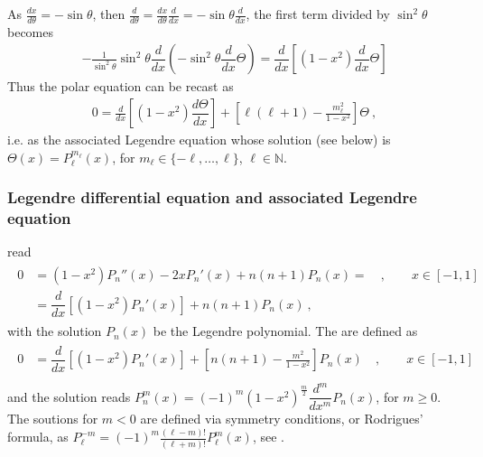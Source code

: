 \documentclass[letterpaper,10pt,english]{jupyterBook}
\begin{document}
\sphinxAtStartPar
As \(\frac{d x}{d \theta} = - \sin \theta\), then \(\frac{d}{d\theta} = \frac{d x}{d \theta} \frac{d}{d x} = - \sin \theta \frac{d}{d x}\), the first term \sphinxhyphen{} divided by \(\sin^2 \theta\) \sphinxhyphen{} becomes
\begin{equation*}
\begin{split}-\frac{1}{\sin^2 \theta} \sin^2 \theta \dfrac{d}{dx} \left( - \sin^2 \theta \dfrac{d}{dx} \Theta \right) = \dfrac{d}{dx}\left[ ( 1 - x^2) \dfrac{d}{dx} \Theta \right]\end{split}
\end{equation*}
\sphinxAtStartPar
Thus the polar equation can be recast as
\begin{equation*}
\begin{split}0 = \frac{d}{dx} \left[ ( 1 - x^2 ) \dfrac{d \Theta}{dx} \right] + \left[ \ell(\ell+1) - \frac{m_\ell^2}{1 - x^2} \right] \Theta  \ ,\end{split}
\end{equation*}
\sphinxAtStartPar
i.e. as the associated Legendre equation whose solution (see below) is \(\Theta(x) = P_\ell^{m_{\ell}}(x)\), for \(m_{\ell} \in \{ - \ell, \dots, \ell\}\), \(\ell \in \mathbb{N}\).
\subsubsection*{Legendre differential equation and associated Legendre equation}

\sphinxAtStartPar
{} read
\begin{equation*}
\begin{split}\begin{aligned}
  0
  & = (1- x^2) P_n''(x) - 2 x P_n'(x) + n(n+1) P_n(x) =  \quad , \qquad x \in [-1, 1] \\
  & = \dfrac{d}{dx} \left[ ( 1-x^2 ) P_n'(x) \right] + n(n+1) P_n(x) \ ,
\end{aligned}\end{split}
\end{equation*}
\sphinxAtStartPar
with the solution \(P_n(x)\) be the Legendre polynomial. The  are defined as
\begin{equation*}
\begin{split}\begin{aligned}
  0
  & = \dfrac{d}{dx} \left[ ( 1-x^2 ) P_n'(x) \right] + \left[ n(n+1) - \frac{m^2}{1-x^2} \right] P_n(x) \quad , \qquad x \in [-1, 1] \\
\end{aligned}\end{split}
\end{equation*}
\sphinxAtStartPar
and the solution reads \(P_{n}^{m}(x) = (-1)^{m} \left( 1 - x^2 \right)^{\frac{m}{2}} \dfrac{d^m}{dx^m} P_{n}(x)\), for \(m \ge 0\).
The soutions for \(m < 0\) are defined via symmetry conditions, or Rodrigues’ formula, as \(P_{\ell}^{-m} = (-1)^{m} \frac{(\ell-m)!}{(\ell+m)!} P_{\ell}^{m}(x)\), see .
\end{document}

